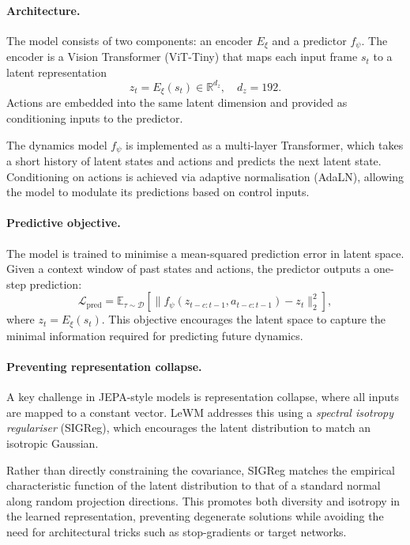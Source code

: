 \paragraph{Architecture.}
The model consists of two components: an encoder $E_\xi$ and a predictor
$f_\psi$. The encoder is a Vision Transformer (ViT-Tiny) that maps each
input frame $s_t$ to a latent representation
\[
z_t = E_\xi(s_t) \in \mathbb{R}^{d_z}, \quad d_z = 192.
\]
Actions are embedded into the same latent dimension and provided as
conditioning inputs to the predictor.

The dynamics model $f_\psi$ is implemented as a multi-layer Transformer,
which takes a short history of latent states and actions and predicts the
next latent state. Conditioning on actions is achieved via adaptive
normalisation (AdaLN), allowing the model to modulate its predictions based
on control inputs.

\paragraph{Predictive objective.}
The model is trained to minimise a mean-squared prediction error in latent
space. Given a context window of past states and actions, the predictor
outputs a one-step prediction:
\begin{equation}
\mathcal{L}_{\mathrm{pred}}
= \mathbb{E}_{\tau \sim \mathcal{D}} \left[
\big\| f_\psi(z_{t-c:t-1}, a_{t-c:t-1}) - z_t \big\|_2^2
\right],
\label{eq:pred-loss-clean}
\end{equation}
where $z_t = E_\xi(s_t)$. This objective encourages the latent space to
capture the minimal information required for predicting future dynamics.

\paragraph{Preventing representation collapse.}
A key challenge in JEPA-style models is representation collapse, where all
inputs are mapped to a constant vector. LeWM addresses this using a
\emph{spectral isotropy regulariser} (SIGReg), which encourages the latent
distribution to match an isotropic Gaussian.

Rather than directly constraining the covariance, SIGReg matches the
empirical characteristic function of the latent distribution to that of a
standard normal along random projection directions. This promotes both
diversity and isotropy in the learned representation, preventing degenerate
solutions while avoiding the need for architectural tricks such as
stop-gradients or target networks.

